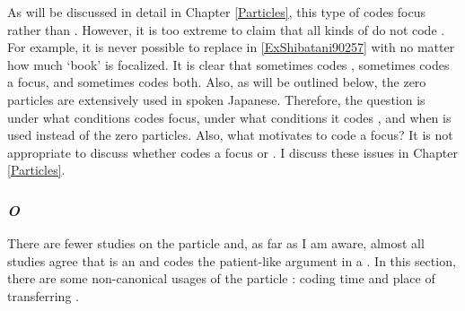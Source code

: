 As will be discussed in detail in Chapter \ref{Particles},
this type of  codes focus rather than .
However, it is too extreme to claim that all kinds of  do not code .
For example, it is never possible to replace
 in \ref{ExShibatani90257} with 
no matter how much  `book' is focalized.
It is clear that  sometimes codes , sometimes codes a focus, and sometimes codes both.
Also, as will be outlined below,
the zero particles are extensively used in spoken Japanese.
Therefore, the question is under what conditions  codes focus,
under what conditions it codes ,
and when  is used instead of the zero particles.
Also, what motivates  to code a focus?
It is not appropriate to discuss
whether  codes a focus or .
I discuss these issues in Chapter \ref{Particles}.



\subsubsection{\textit{O}}

There are fewer studies on the particle  and,
as far as I am aware, almost all studies agree that  is an 
and codes the patient-like argument in a  \cite[e.g.,][]{yamada36,shibatani90}.
In this section,
there are some non-canonical usages of the particle :
coding time and place of transferring \cite{yamada36}.

